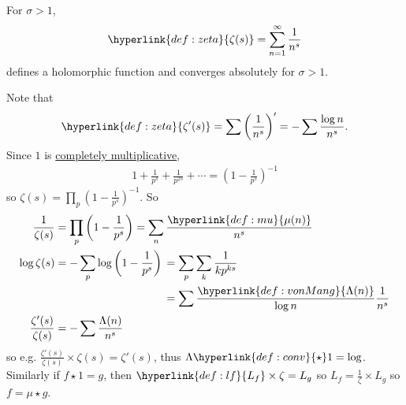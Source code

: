 \documentclass{article}
\begin{document}
\begin{defi}
  For $\sigma > 1$,
  \begin{equation*}
  \hyperlink{def:zeta}{\zeta(s)} = \sum_{n = 1}^\infty \frac{1}{n^s}
  \end{equation*}
  defines a holomorphic function and converges absolutely for $\sigma > 1$.
\end{defi}
Note that
\begin{equation*}\hyperlink{def:zeta}{\zeta'(s)} = \sum \left(\frac{1}{n^s}\right)' = - \sum \frac{\log n}{n^s}.\end{equation*}
Since \hyperlink{def:1}{$1$} is \hyperlink{def:multi}{completely multiplicative},
\begin{align*}
  1 + \frac{1}{p^s} + \frac{1}{p^{2s}} + \dotsb = \left(1 - \frac{1}{p^s}\right)^{-1}
\end{align*}
so $\zeta(s) = \prod_p (1 - \frac{1}{p^s})^{-1}$.
So
\begin{align*}
  \frac{1}{\zeta(s)} &= \prod_p \left(1 - \frac{1}{p^s}\right) = \sum_{n} \frac{\hyperlink{def:mu}{\mu(n)}}{n^s} \\
  \log \zeta(s) &= - \sum_p \log\left(1 - \frac{1}{p^s}\right)
  \begin{aligned}[t]
    &=\sum_p \sum_k \frac{1}{kp^{ks}} \\
    &= \sum \frac{\hyperlink{def:vonMang}{\Lambda(n)}}{\log n} \frac{1}{n^s}
  \end{aligned}\\
  \frac{\zeta'(s)}{\zeta(s)} &= - \sum \frac{\Lambda(n)}{n^s}
\end{align*}
so e.g. $\frac{\zeta'(s)}{\zeta(s)} \times \zeta(s) = \zeta'(s)$, thus $\Lambda \hyperlink{def:conv}{\star} 1 = \log$.
Similarly if $f \star 1 = g$, then $\hyperlink{def:lf}{L_f} \times \zeta = L_g$ so $L_f = \frac{1}{\zeta} \times L_g$ so $f = \mu \star g$.
\end{document}
